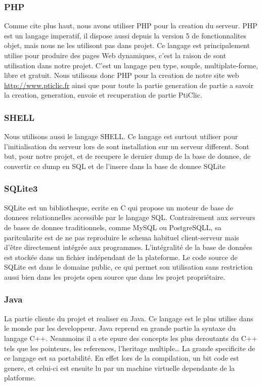 \documentclass[a4paper,11pt,french]{article}
\begin{document}
\subsubsection{PHP}
Comme cite plus haut, nous avons utiliser PHP pour la creation du serveur. PHP est un langage imperatif, il dispose aussi depuis la version 5 de fonctionnalites objet, mais nous ne les utilisont pas dans projet. Ce langage est
principalement utilise pour produire des pages Web dynamiques, c'est la raison de sont utilisation dans notre projet. C'est un langage peu type, souple, multiplate-forme, libre et gratuit.
Nous utilisons donc PHP pour la creation de notre site web \url{http://www.pticlic.fr} ainsi que pour toute la partie generation de partie a savoir la creation, generation, envoie et recuperation de partie PtiClic.

\subsubsection{SHELL}
Nous utilisons aussi le langage SHELL. Ce langage est surtout utiliser pour l'initialisation du serveur lors de sont installation sur un serveur different. Sont but, pour notre projet, et de recupere le dernier dump de la base de donnee,
de convertir ce dump en SQL et de l'insere dans la base de donnee SQLite

\subsubsection{SQLite3}
SQLite est un bibliotheque, ecrite en C qui propose un moteur de base de donnees relationnelles accessible par le langage SQL. Contrairement aux serveurs de bases de donnee traditionnels, comme MySQL ou PostgreSQLL, sa paritcularite est
de ne pas reproduire le schema habituel client-serveur mais d'être directement intégrée aux programmes. L'intégralité de la base de données est stockée dans un fichier indépendant de la plateforme. Le code source de SQLite est dans le domaine public, ce qui permet son utilisation sans restriction aussi bien dans les projets open source que dans les projet propriétaire.

\subsubsection{Java}
La partie cliente du projet et realiser en Java. Ce langage est le plus utilise dans le monde par les developpeur. Java reprend en grande partie la syntaxe du langage C++. Neanmoins il a ete epure des concepts les plus deroutants du C++ tels que les pointeurs, les references, l'heritage multiple\dots{}
La grande specificite de ce langage est sa portabilité. En effet lors de la compilation, un bit code est genere, et celui-ci est ensuite lu par un machine virtuelle dependante de la platforme.
\end{document}
